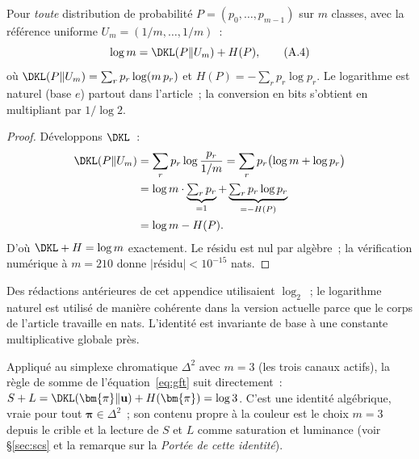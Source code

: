 \documentclass[12pt,a4paper]{article}
\begin{document}
\begin{identitybox}[R\`egle de somme~: $\DKL + H = \log m$]
Pour \emph{toute} distribution de probabilit\'e
$P = (p_0, \ldots, p_{m-1})$ sur $m$ classes, avec la r\'ef\'erence
uniforme $U_m = (1/m, \ldots, 1/m)$~:
\begin{equation}
  \log m = \DKL(P \| U_m) + H(P),
  \tag{A.4}
\end{equation}
o\`u $\DKL(P\|U_m) = \sum_r p_r \log(m\, p_r)$ et
$H(P) = -\sum_r p_r \log p_r$. Le logarithme est naturel (base $e$)
partout dans l'article~; la conversion en bits s'obtient en
multipliant par $1/\log 2$.

\begin{proof}
D\'eveloppons $\DKL$~:
\begin{align*}
  \DKL(P\|U_m)
  &= \sum_r p_r \log\frac{p_r}{1/m}
   = \sum_r p_r \bigl(\log m + \log p_r\bigr) \\
  &= \log m \cdot \underbrace{\textstyle\sum_r p_r}_{=1}
   + \underbrace{\textstyle\sum_r p_r \log p_r}_{=-H(P)} \\
  &= \log m - H(P).
\end{align*}
D'o\`u $\DKL + H = \log m$ exactement. Le r\'esidu est nul par
alg\`ebre~; la v\'erification num\'erique \`a $m = 210$ donne
$|\text{r\'esidu}| < 10^{-15}$ nats.
\end{proof}
\end{identitybox}

\begin{remark}
Des r\'edactions ant\'erieures de cet appendice utilisaient $\log_2$~;
le logarithme naturel est utilis\'e de mani\`ere coh\'erente dans la
version actuelle parce que le corps de l'article travaille en nats.
L'identit\'e est invariante de base \`a une constante multiplicative
globale pr\`es.
\end{remark}

\begin{remark}
Appliqu\'e au simplexe chromatique $\Delta^2$ avec $m = 3$ (les trois
canaux actifs), la r\`egle de somme de l'\'equation~\eqref{eq:gft}
suit directement~:
$S + L = \DKL(\bm{\pi}\|\mathbf{u}) + H(\bm{\pi}) = \log 3$. C'est une
identit\'e alg\'ebrique, vraie pour tout $\bm{\pi} \in \Delta^2$~; son
contenu propre \`a la couleur est le choix $m = 3$ depuis le crible
et la lecture de $S$ et $L$ comme saturation et luminance (voir
\S\ref{sec:scs} et la remarque sur la \emph{Port\'ee de cette
identit\'e}).
\end{remark}

\end{document}
